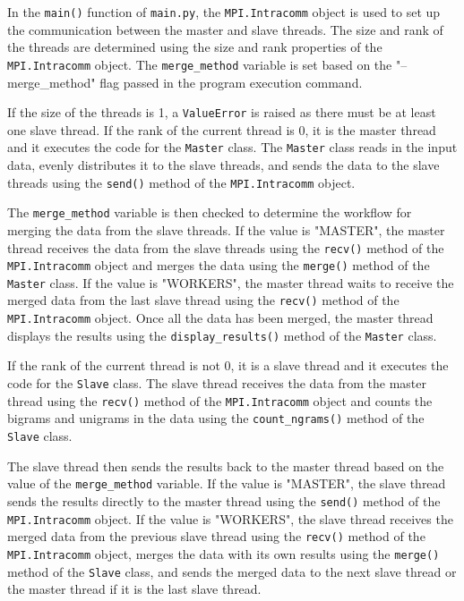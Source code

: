\documentclass[12pt, A4, titlepage]{article}
\begin{document}
In the \texttt{main()} function of \texttt{main.py}, the \texttt{MPI.Intracomm} object is used to set up the communication between the master and slave threads. The size and rank of the threads are determined using the size and rank properties of the \texttt{MPI.Intracomm} object. The \texttt{merge\_method} variable is set based on the "--merge\_method" flag passed in the program execution command.

If the size of the threads is 1, a \texttt{ValueError} is raised as there must be at least one slave thread. If the rank of the current thread is 0, it is the master thread and it executes the code for the \texttt{Master} class. The \texttt{Master} class reads in the input data, evenly distributes it to the slave threads, and sends the data to the slave threads using the \texttt{send()} method of the \texttt{MPI.Intracomm} object.


The \texttt{merge\_method} variable is then checked to determine the workflow for merging the data from the slave threads. If the value is "MASTER", the master thread receives the data from the slave threads using the \texttt{recv()} method of the \texttt{MPI.Intracomm} object and merges the data using the \texttt{merge()} method of the \texttt{Master} class. If the value is "WORKERS", the master thread waits to receive the merged data from the last slave thread using the \texttt{recv()} method of the \texttt{MPI.Intracomm} object.
Once all the data has been merged, the master thread displays the results using the \texttt{display\_results()} method of the \texttt{Master} class.

If the rank of the current thread is not 0, it is a slave thread and it executes the code for the \texttt{Slave} class. The slave thread receives the data from the master thread using the \texttt{recv()} method of the \texttt{MPI.Intracomm} object and counts the bigrams and unigrams in the data using the \texttt{count\_ngrams()} method of the \texttt{Slave} class.

The slave thread then sends the results back to the master thread based on the value of the \texttt{merge\_method} variable. If the value is "MASTER", the slave thread sends the results directly to the master thread using the \texttt{send()} method of the \texttt{MPI.Intracomm} object. If the value is "WORKERS", the slave thread receives the merged data from the previous slave thread using the \texttt{recv()} method of the \texttt{MPI.Intracomm} object, merges the data with its own results using the \texttt{merge()} method of the \texttt{Slave} class, and sends the merged data to the next slave thread or the master thread if it is the last slave thread.
\end{document}
